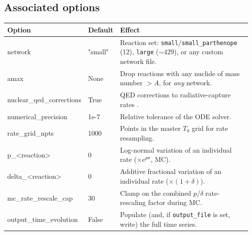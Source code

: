 \documentclass[11pt,a4paper]{article}
\newcommand{\code}[1]{\texttt{#1}}
\begin{document}
\subsection{Associated options}
\begin{center}\small
\begin{tabular}{>{\ttfamily}l l >{\raggedright\arraybackslash}p{8.4cm}}
\toprule
\normalfont Option & Default & Effect \\
\midrule
network                 & "small" & Reaction set: \code{small}/\code{small\_parthenope} (12), \code{large} ($\sim$429), or any custom network file. \\
amax                    & None    & Drop reactions with any nuclide of mass number $> A$, for \emph{any} network. \\
nuclear\_qed\_corrections & True  & QED corrections to radiative-capture rates \cite{PitrouPospelov2020}. \\
numerical\_precision    & 1e-7    & Relative tolerance of the ODE solver. \\
rate\_grid\_npts        & 1000    & Points in the master $T_9$ grid for rate resampling. \\
p\_<reaction>           & 0       & Log-normal variation of an individual rate ($\times e^{p\sigma}$, MC). \\
delta\_<reaction>       & 0       & Additive fractional variation of an individual rate ($\times(1+\delta)$). \\
mc\_rate\_rescale\_cap  & 30      & Clamp on the combined $p$/$\delta$ rate-rescaling factor during MC. \\
output\_time\_evolution & False   & Populate (and, if \code{output\_file} is set, write) the full time series. \\
\bottomrule
\end{tabular}
\end{center}

\end{document}
